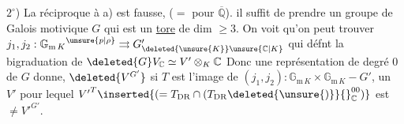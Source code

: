 $2^\circ$) La réciproque à a) est fausse,  ($=$ pour $\overline{\mathbb Q}$). il suffit de prendre un groupe de Galois motivique $G$ qui est un \uline{tore} de dim $\geq 3$. On voit qu'on peut trouver 
$j_1,j_2:{\mathbb G_{\mathrm m\,K}}^{\unsure{p|\rho}}\rightrightarrows G'_{\deleted{\unsure{K}}\unsure{\mathbb C|K}}$ qui défnt  la bigraduation de
$\deleted{G}V_{\mathbb C}\simeq V'\otimes_K\mathbb C$ \quad [$V'=P\mathbin{\overset{G_K}{\deleted{\unsure{\times}}}}V$, $P\unsure{\simeq|=}\underline{\operatorname{Isom}}_{\otimes}(T_{\mathrm B}\otimes K,T_{\mathrm{DR}})$]
Donc une représentation  de degré 0 de $G$ donne, $\deleted{V^{G'}}$ si $T$ est l'image de $(j_1,j_2):\mathbb G_{\mathrm m\,K}\times\mathbb G_{\mathrm m\,K}\mathbin{-}G'$, un $V'$ pour lequel
${V'}^{T}\inserted{(=T_{\mathrm{DR}}\cap(T_{\mathrm{DR}}\deleted{\unsure{)}}{}_{\mathbb C}^{00})}$
 est $\ne {V'}^{G'}$.

